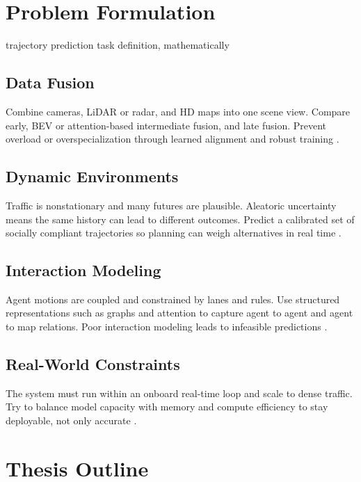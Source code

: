 \section{Problem Formulation}
trajectory prediction task definition, mathematically

\subsection{Data Fusion}
Combine cameras, LiDAR or radar, and HD maps into one scene view. Compare early, BEV or attention-based intermediate fusion, and late fusion. Prevent overload or overspecialization through learned alignment and robust training \cite{madjid2025survey}.

\subsection{Dynamic Environments}
Traffic is nonstationary and many futures are plausible. Aleatoric uncertainty means the same history can lead to different outcomes. Predict a calibrated set of socially compliant trajectories so planning can weigh alternatives in real time \cite{madjid2025survey}.

\subsection{Interaction Modeling}
Agent motions are coupled and constrained by lanes and rules. Use structured representations such as graphs and attention to capture agent to agent and agent to map relations. Poor interaction modeling leads to infeasible predictions \cite{huang2022survey}.

\subsection{Real-World Constraints}
The system must run within an onboard real-time loop and scale to dense traffic. Try to balance model capacity with memory and compute efficiency to stay deployable, not only accurate \cite{Wayformer2022,huang2022survey}. \\



\section{Thesis Outline}



